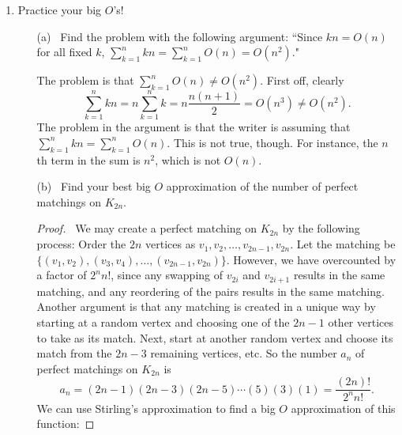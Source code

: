 \documentclass[12pt]{article}
\begin{document}
\begin{enumerate}[leftmargin=0cm,itemindent=.5cm,labelwidth=\itemindent,labelsep=0cm,align=left]
\begin{proof}
\ First, we should redefine the sequence to start at $0$, so that the sequence terms line up with powers of $x$ in the generating function.  So $L_0 = 2$ and $L_1 = 1$.  Let

$$f(x) = \sum_{n=0}^\infty L_n x^n.$$
Then
\begin{align*}
xf(x) + f(x)
&= \sum_{n=0}^\infty L_n x^{n+1} + \sum_{n=0}^\infty L_n x^{n}
\\
&= \sum_{n=0}^\infty L_n x^{n+1} + \sum_{n=1}^\infty L_n x^{n} + L_0
\\
&= \sum_{n=0}^\infty L_n x^{n+1} + \sum_{n=0}^\infty L_{n+1} x^{n+1} + L_0
\\
&= \sum_{n=0}^\infty (L_n + L_{n+1}) x^{n+1} + L_0
\\
&= \sum_{n=0}^\infty (L_{n+2}) x^{n+1} + L_0
\end{align*}
$$x^2f(x) + xf(x) - 2x = x^2f(x) + xf(x) - xL_0 = \sum_{n=0}^\infty (L_{n+2}) x^{n+2} = f(x) - L_0 - xL_1 = f(x) - 2 - x
$$
$$
(x^2 + x - 1)f(x) = x-2
$$
$$
f(x) = \dfrac{x - 2}{x^2 + x - 1}.
$$
\end{proof}

\item Practice your big $O$'s!
\begin{enumerate}
\item[(a)] \ Find the problem with the following argument: ``Since $kn = O(n)$ for all fixed $k$, $\sum_{k=1}^n kn = \sum_{k=1}^n O(n) = O(n^2)$."

The problem is that $\sum_{k=1}^n O(n) \neq O(n^2)$.  First off, clearly $$\sum_{k=1}^n kn = n \sum_{k=1}^n k = n \dfrac{n(n+1)}{2} = O(n^3) \neq O(n^2).$$
The problem in the argument is that the writer is assuming that $\sum_{k=1}^n kn = \sum_{k=1}^n O(n)$.  This is not true, though.  For instance, the $n$th term in the sum is $n^2$, which is not $O(n)$.
\pagebreak
\item[(b)] \ Find your best big $O$ approximation of the number of perfect matchings on $K_{2n}$.

\begin{proof}
\ We may create a perfect matching on $K_{2n}$ by the following process:  Order the $2n$ vertices as $v_1, v_2, \dots, v_{2n-1}, v_{2n}$.  Let the matching be $\{(v_1,v_2), (v_3,v_4), \dots , (v_{2n-1}, v_{2n}) \}$.  However, we have overcounted by a factor of $2^n n!$, since any swapping of $v_{2i}$ and $v_{2i+1}$ results in the same matching, and any reordering of the pairs results in the same matching.  Another argument is that any matching is created in a unique way by starting at a random vertex and choosing one of the $2n-1$ other vertices to take as its match.  Next, start at another random vertex and choose its match from the $2n-3$ remaining vertices, etc.  So the number $a_n$ of perfect matchings on $K_{2n}$ is $$a_n = (2n-1)(2n-3)(2n-5) \cdots (5)(3)(1) = \dfrac{(2n)!}{2^n n!}.$$  We can use Stirling's approximation to find a big $O$ approximation of this function:


\end{proof}
\end{enumerate}
\end{enumerate}
\end{document}
